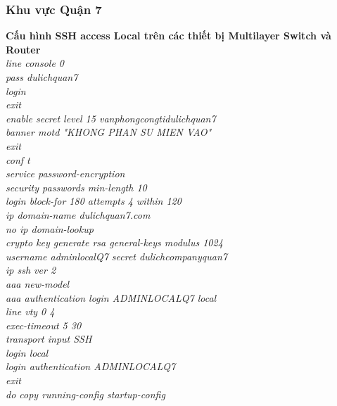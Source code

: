 \documentclass[a4paper, 12pt]{article}
\begin{document}
\subsubsection{Khu vực Quận 7}
\hspace*{1cm} \textbf{Cấu hình SSH access Local trên các thiết bị Multilayer Switch và Router}\\
\hspace*{2cm}\textit{line console 0\\
\hspace*{2cm}pass dulichquan7\\
\hspace*{2cm}login\\
\hspace*{2cm}exit\\
\hspace*{2cm}enable secret level 15 vanphongcongtidulichquan7\\
\hspace*{2cm}banner motd "KHONG PHAN SU MIEN VAO"\\
\hspace*{2cm}exit\\
\hspace*{2cm}conf t\\
\hspace*{2cm}service password-encryption\\
\hspace*{2cm}security passwords min-length 10\\
\hspace*{2cm}login block-for 180 attempts 4 within 120\\
\hspace*{2cm}ip domain-name dulichquan7.com\\
\hspace*{2cm}no ip domain-lookup\\
\hspace*{2cm}crypto key generate rsa general-keys modulus 1024\\
\hspace*{2cm}username adminlocalQ7 secret dulichcompanyquan7\\
\hspace*{2cm}ip ssh ver 2\\
\hspace*{2cm}aaa new-model\\
\hspace*{2cm}aaa authentication login ADMINLOCALQ7 local\\
\hspace*{2cm}line vty 0 4\\
\hspace*{2cm}exec-timeout 5 30\\
\hspace*{2cm}transport input SSH \\
\hspace*{2cm}login local\\
\hspace*{2cm}login authentication ADMINLOCALQ7\\
\hspace*{2cm}exit\\
\hspace*{2cm}do copy running-config startup-config\\}
\end{document}
